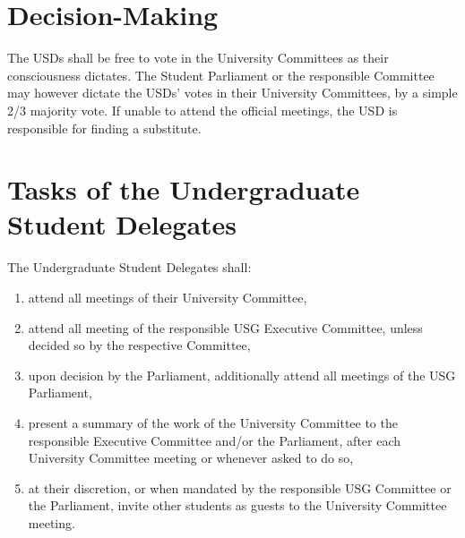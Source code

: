 \section{Decision-Making}
The USDs shall be free to vote in the University Committees as their consciousness dictates. The Student Parliament or the responsible Committee may however dictate the USDs' votes in their University Committees, by a simple 2/3 majority vote. If unable to attend the official meetings, the USD is responsible for finding a substitute.

\section{Tasks of the Undergraduate Student Delegates}
The Undergraduate Student Delegates shall:
\begin{enumerate}
    \item attend all meetings of their University Committee,
    \item attend all meeting of the responsible USG Executive Committee, unless decided so by the respective Committee,
    \item upon decision by the Parliament, additionally attend all meetings of the USG Parliament,
    \item present a summary of the work of the University Committee to the responsible Executive Committee and/or the Parliament, after each University Committee meeting or whenever asked to do so,
    \item at their discretion, or when mandated by the responsible USG Committee or the Parliament, invite other students as guests to the University Committee meeting.
\end{enumerate}